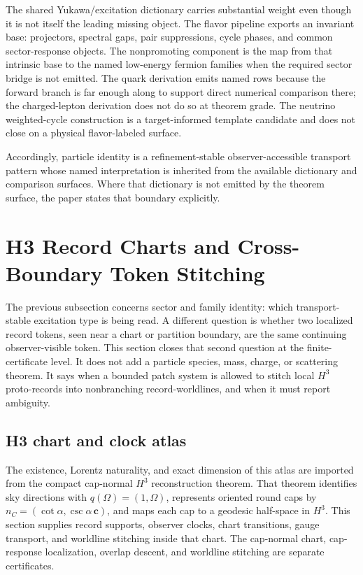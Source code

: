 \documentclass[11pt]{article}
\begin{document}
The shared Yukawa/excitation dictionary carries substantial weight even though it is not
itself the leading missing object. The flavor pipeline exports an invariant base:
projectors, spectral gaps, pair suppressions, cycle phases, and common sector-response objects.
The nonpromoting component is the map from that intrinsic base to the named low-energy fermion
families when the required sector bridge is not emitted. The quark derivation emits named rows because the forward branch is far enough along to
support direct numerical comparison there; the charged-lepton derivation does not do so at theorem
grade. The neutrino weighted-cycle construction is a target-informed template candidate and
does not close on a physical flavor-labeled surface.

Accordingly, particle identity is a refinement-stable
observer-accessible transport pattern whose named interpretation is inherited from the
available dictionary and comparison surfaces. Where that dictionary is not emitted by the theorem
surface, the paper states that boundary explicitly.

\section{H3 Record Charts and Cross-Boundary Token Stitching}\label{sec:h3-record-worldlines}

The previous subsection concerns sector and family identity: which transport-stable excitation
type is being read. A different question is whether two localized record tokens, seen near a chart
or partition boundary, are the same continuing observer-visible token. This section closes that
second question at the finite-certificate level. It does not add a particle species, mass, charge,
or scattering theorem. It says when a bounded patch system is allowed to stitch local \(H^3\)
proto-records into nonbranching record-worldlines, and when it must report ambiguity.

\subsection{H3 chart and clock atlas}

The existence, Lorentz naturality, and exact dimension of this atlas are imported from the compact
cap-normal \(H^3\) reconstruction theorem. That theorem identifies sky directions with
\(q(\Omega)=(1,\Omega)\), represents oriented round caps by
\(n_C=(\cot\alpha,\csc\alpha\,\mathbf c)\), and maps each cap to a geodesic half-space in
\(H^3\). This section supplies record supports, observer clocks,
chart transitions, gauge transport, and worldline stitching inside that chart. The cap-normal
chart, cap-response localization, overlap descent, and worldline stitching are separate
certificates.
\end{document}
